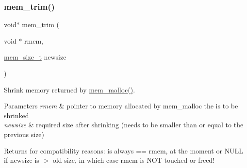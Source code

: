 \subsubsection{\texorpdfstring{mem\+\_\+trim()}{mem\_trim()}}
{\footnotesize\ttfamily void$\ast$ mem\+\_\+trim (\begin{DoxyParamCaption}\item[{void $\ast$}]{rmem,  }\item[{\hyperlink{native_2lwip_2src_2include_2lwip_2mem_8h_a49bff6e5dd4cb95fe6dc0670962bbf54}{mem\+\_\+size\+\_\+t}}]{newsize }\end{DoxyParamCaption})}

Shrink memory returned by \hyperlink{native_2lwip_2src_2core_2mem_8c_a932aa40d85b14cb7331625e012d12335}{mem\+\_\+malloc()}.


\begin{DoxyParams}{Parameters}
{\em rmem} & pointer to memory allocated by mem\+\_\+malloc the is to be shrinked \\
\hline
{\em newsize} & required size after shrinking (needs to be smaller than or equal to the previous size) \\
\hline
\end{DoxyParams}
\begin{DoxyReturn}{Returns}
for compatibility reasons\+: is always == rmem, at the moment or N\+U\+LL if newsize is $>$ old size, in which case rmem is N\+OT touched or freed! 
\end{DoxyReturn}
